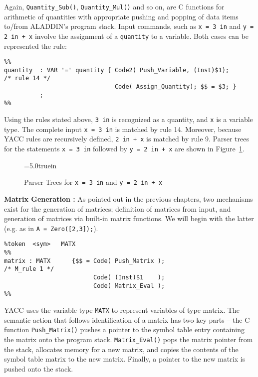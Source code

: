 \vspace{0.15 in}\noindent
Again, {\tt Quantity\_Sub()}, {\tt Quantity\_Mul()} and so on, are
C functions for arithmetic of quantities with appropriate pushing
and popping of data items to/from ALADDIN's program stack.
Input commands, such as {\tt x = 3 in} and {\tt y = 2 in + x}
involve the assignment of a {\tt quantity} to a variable.
Both cases can be represented the rule:

\begin{footnotesize}
\begin{verbatim}
%%
quantity  : VAR '=' quantity { Code2( Push_Variable, (Inst)$1);       /* rule 14 */
                               Code( Assign_Quantity); $$ = $3; }     
          ;
%%
\end{verbatim}
\end{footnotesize}

\vspace{0.15 in}\noindent
Using the rules stated above,
{\tt 3 in} is recognized as a quantity, and {\tt x} is a variable type.
The complete input {\tt x = 3 in} is matched by rule 14.
Moreover, because YACC rules are recursively defined, {\tt 2 in + x} is matched by rule 9.
Parser trees for the statements
{\tt x = 3 in} followed by {\tt y = 2 in + x}
are shown in Figure~\ref{fig: p_tree}.

\begin{figure}[ht]
\epsfxsize=5.0truein
\centerline{}
\caption{Parser Trees for {\tt x = 3 in} and {\tt y = 2 in + x}}
\label{fig: p_tree}
\end{figure}

\vspace{0.20 in}\noindent
{\bf Matrix Generation :}
As pointed out in the previous chapters,
two mechanisms exist for the generation of matrices;
definition of matrices from input, and generation of 
matrices via built-in matrix functions.
We will begin with the latter (e.g. as in {\tt A = Zero([2,3]);}).

\begin{footnotesize}
\begin{verbatim}
%token  <sym>   MATX
%%
matrix : MATX      {$$ = Code( Push_Matrix );                         /* M_rule 1 */
                         Code( (Inst)$1    );
                         Code( Matrix_Eval );                          
%%
\end{verbatim}
\end{footnotesize}

\vspace{0.15 in}\noindent
YACC uses the variable type {\tt MATX} to represent variables of type matrix.
The semantic action that follows identification of a matrix has two key parts --
the C function {\tt Push\_Matrix()} pushes a pointer to the symbol table entry
containing the matrix onto the program stack.
{\tt Matrix\_Eval()} pops the matrix pointer from the stack,
allocates memory for a new matrix, and copies the contents of the
symbol table matrix to the new matrix. Finally, a pointer to
the new matrix is pushed onto the stack.

